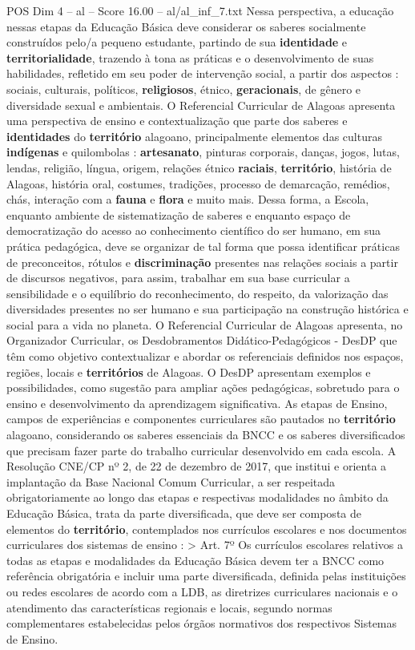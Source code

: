\begin{textsample}{POS Dim 4 – al – Score 16.00 – al/al\_inf\_7.txt}
Nessa perspectiva, a educação nessas etapas da Educação Básica deve considerar os saberes socialmente construídos pelo/a pequeno estudante, partindo de sua \textbf{identidade} e \textbf{territorialidade}, trazendo à tona as práticas e o desenvolvimento de suas habilidades, refletido em seu poder de intervenção social, a partir dos aspectos : sociais, culturais, políticos, \textbf{religiosos}, étnico, \textbf{geracionais}, de gênero e diversidade sexual e ambientais.
O Referencial Curricular de Alagoas apresenta uma perspectiva de ensino e contextualização que parte dos saberes e \textbf{identidades} do \textbf{território} alagoano, principalmente elementos das culturas \textbf{indígenas} e quilombolas : \textbf{artesanato}, pinturas corporais, danças, jogos, lutas, lendas, religião, língua, origem, relações étnico \textbf{raciais}, \textbf{território}, história de Alagoas, história oral, costumes, tradições, processo de demarcação, remédios, chás, interação com a \textbf{fauna} e \textbf{flora} e muito mais.
Dessa forma, a Escola, enquanto ambiente de sistematização de saberes e enquanto espaço de democratização do acesso ao conhecimento científico do ser humano, em sua prática pedagógica, deve se organizar de tal forma que possa identificar práticas de preconceitos, rótulos e \textbf{discriminação} presentes nas relações sociais a partir de discursos negativos, para assim, trabalhar em sua base curricular a sensibilidade e o equilíbrio do reconhecimento, do respeito, da valorização das diversidades presentes no ser humano e sua participação na construção histórica e social para a vida no planeta.
O Referencial Curricular de Alagoas apresenta, no Organizador Curricular, os Desdobramentos Didático-Pedagógicos - DesDP que têm como objetivo contextualizar e abordar os referenciais definidos nos espaços, regiões, locais e \textbf{territórios} de Alagoas.
O DesDP apresentam exemplos e possibilidades, como sugestão para ampliar ações pedagógicas, sobretudo para o ensino e desenvolvimento da aprendizagem significativa.
As etapas de Ensino, campos de experiências e componentes curriculares são pautados no \textbf{território} alagoano, considerando os saberes essenciais da BNCC e os saberes diversificados que precisam fazer parte do trabalho curricular desenvolvido em cada escola.
A Resolução CNE/CP nº 2, de 22 de dezembro de 2017, que institui e orienta a implantação da Base Nacional Comum Curricular, a ser respeitada obrigatoriamente ao longo das etapas e respectivas modalidades no âmbito da Educação Básica, trata da parte diversificada, que deve ser composta de elementos do \textbf{território}, contemplados nos currículos escolares e nos documentos curriculares dos sistemas de ensino : > Art. 7º Os currículos escolares relativos a todas as etapas e modalidades da Educação Básica devem ter a BNCC como referência obrigatória e incluir uma parte diversificada, definida pelas instituições ou redes escolares de acordo com a LDB, as diretrizes curriculares nacionais e o atendimento das características regionais e locais, segundo normas complementares estabelecidas pelos órgãos normativos dos respectivos Sistemas de Ensino.

\end{textsample}
